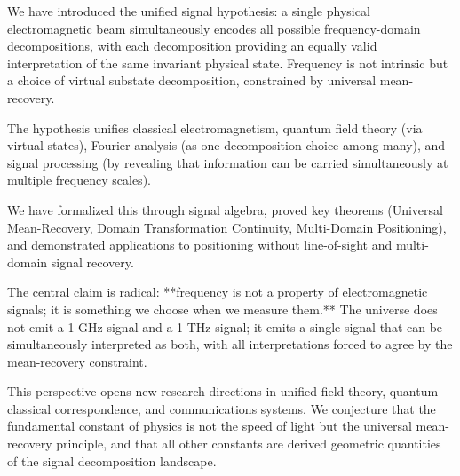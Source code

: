 \documentclass[twocolumn,11pt,a4paper]{article}
\begin{document}
We have introduced the unified signal hypothesis: a single physical electromagnetic beam simultaneously encodes all possible frequency-domain decompositions, with each decomposition providing an equally valid interpretation of the same invariant physical state. Frequency is not intrinsic but a choice of virtual substate decomposition, constrained by universal mean-recovery.

The hypothesis unifies classical electromagnetism, quantum field theory (via virtual states), Fourier analysis (as one decomposition choice among many), and signal processing (by revealing that information can be carried simultaneously at multiple frequency scales).

We have formalized this through signal algebra, proved key theorems (Universal Mean-Recovery, Domain Transformation Continuity, Multi-Domain Positioning), and demonstrated applications to positioning without line-of-sight and multi-domain signal recovery.

The central claim is radical: **frequency is not a property of electromagnetic signals; it is something we choose when we measure them.** The universe does not emit a 1 GHz signal and a 1 THz signal; it emits a single signal that can be simultaneously interpreted as both, with all interpretations forced to agree by the mean-recovery constraint.

This perspective opens new research directions in unified field theory, quantum-classical correspondence, and communications systems. We conjecture that the fundamental constant of physics is not the speed of light but the universal mean-recovery principle, and that all other constants are derived geometric quantities of the signal decomposition landscape.
\end{document}
